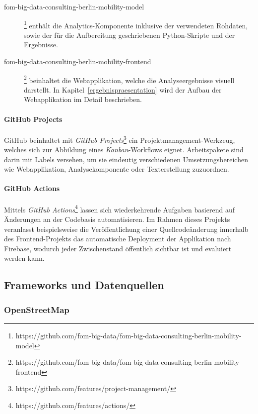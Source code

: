 \begin{description}
    \item[fom-big-data-consulting-berlin-mobility-model]\footnote{https://github.com/fom-big-data/fom-big-data-consulting-berlin-mobility-model} enthält die Analytics-Komponente inklusive der verwendeten Rohdaten, sowie der für die Aufbereitung geschriebenen Python-Skripte und der Ergebnisse.
    \item[fom-big-data-consulting-berlin-mobility-frontend]\footnote{https://github.com/fom-big-data/fom-big-data-consulting-berlin-mobility-frontend} beinhaltet die Webapplikation, welche die Analyseergebnisse visuell darstellt. In Kapitel~\ref{ergebnispraesentation} wird der Aufbau der Webapplikation im Detail beschrieben.
\end{description}

\paragraph*{GitHub Projects}
\label{github_projects}

GitHub beinhaltet mit \emph{GitHub Projects}\footnote{https://github.com/features/project-management/} ein Projektmanagement-Werkzeug, welches sich zur Abbildung eines \emph{Kanban}-Workflows eignet. Arbeitspakete sind darin mit Labels versehen, um sie eindeutig verschiedenen Umsetzungsbereichen wie Webapplikation, Analysekomponente oder Texterstellung zuzuordnen.

\paragraph*{GitHub Actions}
\label{github_actions}

Mittels \emph{GitHub Actions}\footnote{https://github.com/features/actions/} lassen sich wiederkehrende Aufgaben basierend auf Änderungen an der Codebasis automatisieren. Im Rahmen dieses Projekts veranlasst beispielsweise die Veröffentlichung einer Quellcodeänderung innerhalb des Frontend-Projekts das automatische Deployment der Applikation nach Firebase, wodurch jeder Zwischenstand öffentlich sichtbar ist und evaluiert werden kann.

\subsection{Frameworks und Datenquellen}
\label{frameworks_und_datenquellen}

\subsubsection{OpenStreetMap}
\label{open_street_map}

